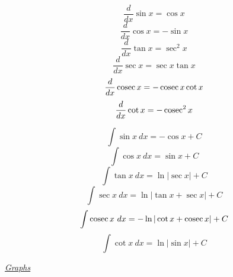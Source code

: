 \documentclass[a4paper]{article}
\def\cosec{\mathop{\rm cosec}\nolimits}
\newcommand{\diff}[1]{\frac{d}{d #1}}
\newcommand{\inte}[2]{\int #1 \ d #2}
\newcommand{\sectitle}[1]{%
	\vspace*{0.8em}
	\begin{center}
		\Large
		\textsl{\underline{#1}}
		\normalsize
	\end{center}
	\vspace*{0.5em}}
\begin{document}
\begin{figure}[h]
\centering
\large
\begin{minipage}{0.49\linewidth}
	$$\diff{x}\sin x = \cos x$$
	\vspace{0.5em}
	$$\diff{x}\cos x = -\sin x$$
	\vspace{0.5em}
	$$\diff{x}\tan x = \sec^2 x$$
	\vspace{0.5em}
	$$\diff{x}\sec x = \sec x\tan x$$
	\vspace{0.5em}
	$$\diff{x}\cosec x = -\cosec x\cot x$$
	\vspace{0.5em}
	$$\diff{x}\cot x = -\cosec^2 x$$
\end{minipage}\hfill
\begin{minipage}{0.49\linewidth}
	$$\inte{\sin x}{x} = -\cos x + C$$
	\vspace{0.5em}
	$$\inte{\cos x}{x} = \sin x + C$$
	\vspace{0.5em}
	$$\inte{\tan x}{x} = \ln|\sec x|+ C$$
	\vspace{0.5em}
	$$\inte{\sec x}{x} = \ln|\tan x + \sec x| + C$$
	\vspace{0.5em}
	$$\inte{\cosec x}{x} = -\ln|\cot x + \cosec x| + C$$
	\vspace{0.5em}
	$$\inte{\cot x}{x} = \ln|\sin x| + C$$
\end{minipage}
\end{figure}

\newpage

\vspace{-2.5em}

\sectitle{Graphs}

\vspace{-1em}
\end{document}
